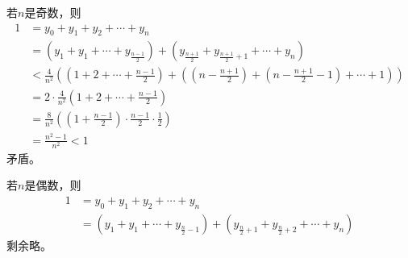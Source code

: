 若$n$是奇数，则
\begin{align*}
  1&=y_0+y_1+y_2+\cdots+y_n\\
  &=\left(y_1+y_1+\cdots+y_{\frac{n-1}2}\right)
  + \left(y_{\frac{n+1}2}+y_{\frac{n+1}2+1}+\cdots+y_n\right)\\
  & <\frac4{n^2}\left(
  \left(1+2+\cdots+\frac{n-1}2\right) +
  \left( \left(n-\frac{n+1}2\right) + \left(n-\frac{n+1}2-1\right) + \cdots + 1\right)
  \right)\\
  &=2\cdot\frac4{n^2}\left(1+2+\cdots+\frac{n-1}2\right)\\
  &=\frac8{n^2}\left( \left(1+\frac{n-1}2\right)\cdot\frac{n-1}2\cdot\frac12 \right)\\
  &=\frac{n^2-1}{n^2}<1
\end{align*}
矛盾。

若$n$是偶数，则
\begin{align*}
  1&=y_0+y_1+y_2+\cdots+y_n\\
  &=\left(y_1+y_1+\cdots+y_{\frac{n}2-1}\right)
  + \left(y_{\frac{n}2+1}+y_{\frac{n}2+2}+\cdots+y_n\right)
\end{align*}
剩余略。


